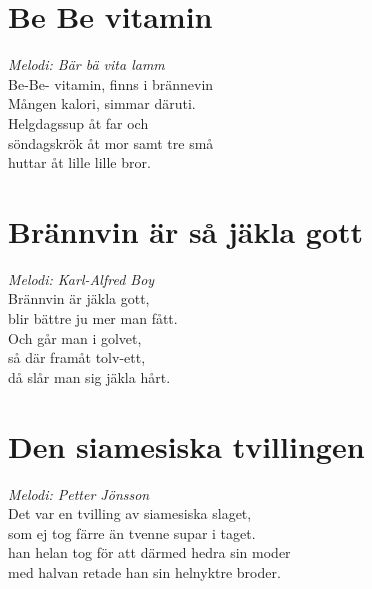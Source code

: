 \section{Be Be vitamin}
\textit{Melodi: Bär bä vita lamm}
\vspace{2mm}\\
Be-Be- vitamin, finns i brännevin\\
Mången kalori, simmar däruti.\\
Helgdagssup åt far och\\
söndagskrök åt mor samt tre små\\
huttar åt lille lille bror.

\section{Brännvin är så jäkla gott}
\textit{Melodi: Karl-Alfred Boy}
\vspace{2mm}\\
Brännvin är jäkla gott,\\
blir bättre ju mer man fått.\\
Och går man i golvet,\\
så där framåt tolv-ett,\\
då slår man sig jäkla hårt.

\section{Den siamesiska tvillingen}
\textit{Melodi: Petter Jönsson}
\vspace{2mm}\\
Det var en tvilling av siamesiska slaget,\\
som ej tog färre än tvenne supar i taget.\\
han helan tog för att därmed hedra sin moder\\
med halvan retade han sin helnyktre broder.
